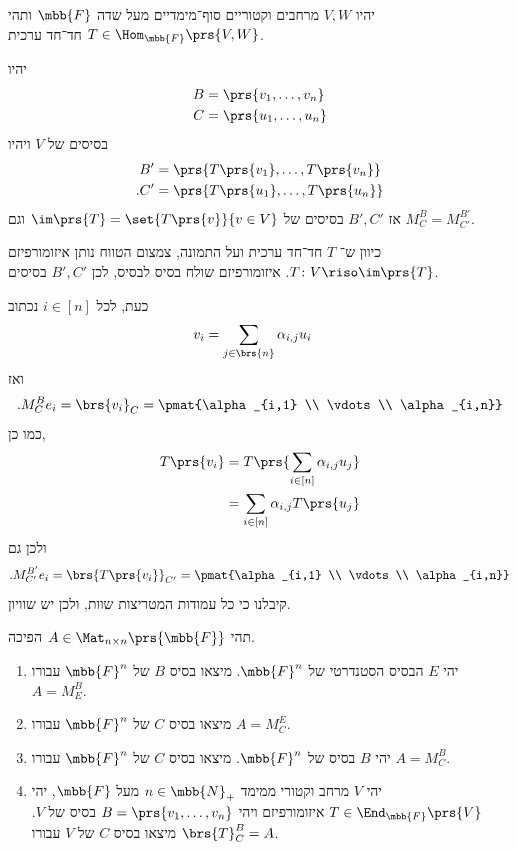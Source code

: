 \documentclass[a4paper,10pt,twoside,openany]{book}
\begin{document}
\begin{exercisechap} \label{exercisechap:change-of-basis-through-isomorphism}
יהיו
$V,W$
מרחבים וקטוריים סוף־מימדיים מעל שדה
$\mbb{F}$
ותהי
$T \in \Hom_{\mbb{F}}\prs{V,W}$
חד־חד ערכית.

יהיו
\begin{align*}
B &= \prs{v_1, \ldots, v_n} \\
C &= \prs{u_1, \ldots, u_n}
\end{align*}
בסיסים של
$V$
ויהיו
\begin{align*}
B' &= \prs{T\prs{v_1}, \ldots, T\prs{v_n}} \\
\text{.} C' &= \prs{T\prs{u_1}, \ldots, T\prs{u_n}}
\end{align*}
אז
$B',C'$
בסיסים של
$\im\prs{T} = \set{T\prs{v}}{v \in V}$
וגם
$M^B_C = M^{B'}_{C'}$.
\end{exercisechap}

\begin{solution}
כיוון ש־%
$T$
חד־חד ערכית ועל התמונה, צמצום הטווח נותן איזומורפיזם
$T \colon V \riso \im\prs{T}$.
איזומורפיזם שולח בסיס לבסיס, לכן
$B',C'$
בסיסים.

כעת, לכל
$i \in [n]$
נכתוב
\begin{align*}
v_i &= \sum_{j \in \brs{n}} \alpha_{i,j} u_i
\end{align*}
ואז
\begin{align*}
\text{.} M^B_C e_i = \brs{v_i}_C = \pmat{\alpha_{i,1} \\ \vdots \\ \alpha_{i,n}}
\end{align*}
כמו כן,
\begin{align*}
T\prs{v_i}
&=
T\prs{\sum_{i \in [n]} \alpha_{i,j} u_j}
\\&=
\sum_{i \in [n]} \alpha_{i,j} T\prs{u_j}
\end{align*}
ולכן גם
\[\text{.} M^{B'}_{C'} e_i = \brs{T\prs{v_i}}_{C'} = \pmat{\alpha_{i,1} \\ \vdots \\ \alpha_{i,n}}\]
קיבלנו כי כל עמודות המטריצות שוות, ולכן יש שוויון.
\end{solution}

\begin{exercisechap}
תהי
$A \in \Mat_{n \times n}\prs{\mbb{F}}$
הפיכה.
\begin{enumerate}
\item יהי
$E$
הבסיס הסטנדרטי של
$\mbb{F}^n$.
מיצאו בסיס
$B$
של
$\mbb{F}^n$
עבורו
$A = M^B_E$.

\item
מיצאו בסיס
$C$
של
$\mbb{F}^n$
עבורו
$A = M^E_C$.

\item
יהי
$B$
בסיס של
$\mbb{F}^n$.
מיצאו בסיס
$C$
של
$\mbb{F}^n$
עבורו
$A = M^B_C$.

\item
יהי
$V$
מרחב וקטורי ממימד
$n \in \mbb{N}_+$
מעל
$\mbb{F}$,
יהי
$T \in \End_{\mbb{F}}\prs{V}$
איזומורפיזם
ויהי
$B = \prs{v_1, \ldots, v_n}$
בסיס של
$V$.
מיצאו בסיס
$C$
של
$V$
עבורו
$\brs{T}^B_C = A$.
\end{enumerate}
\end{exercisechap}
\end{document}
